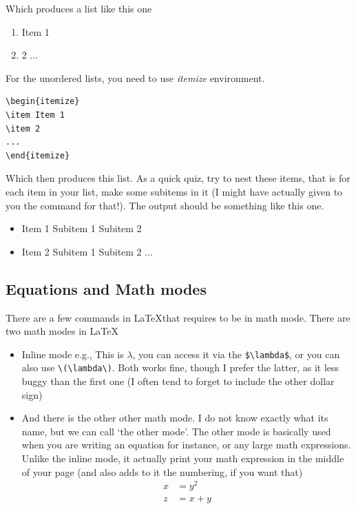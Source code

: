 \documentclass[paper=a4, fontsize=11pt]{scrartcl} %
\numberwithin{equation}{section} %
\numberwithin{figure}{section} %
\numberwithin{table}{section} %
\begin{document}
Which produces a list like this one

\begin{enumerate}
	\item Item 1
	\item 2
	...
\end{enumerate}

For the unordered lists, you need to use \textit{itemize} environment.
\begin{verbatim}
\begin{itemize}
\item Item 1
\item 2
...
\end{itemize}
\end{verbatim}

Which then produces this list. As a quick quiz, try to nest these items, that is for each item in your list, make some subitems in it (I might have actually given to you the command for that!). The output should be something like this one.

\begin{itemize}
	\item Item 1
	\subitem Subitem 1
	\subitem Subitem 2
	\item Item 2
	\subitem Subitem 1
	\subitem Subitem 2 
	...
\end{itemize}

\subsection{Equations and Math modes}
There are a few commands in \LaTeX that requires to be in math mode. There are two math modes in \LaTeX
\begin{itemize}
	\item Inline mode e.g., This is $\lambda$, you can access it via the \verb=$\lambda$=, or you can also use \verb=\(\lambda\)=. Both works fine, though I prefer the latter, as it less buggy than the first one (I often tend to forget to include the other dollar sign)
	\item And there is the other other math mode. I do not know exactly what its name, but we can call `the other mode'. The other mode is basically used when you are writing an equation for instance, or any large math expressions. Unlike the inline mode, it actually print your math expression in the middle of your page (and also adds to it the numbering, if you want that)
	\begin{align}
		x &= y^2\\
		z &= x + y
	\end{align}
\end{itemize}
\end{document}
